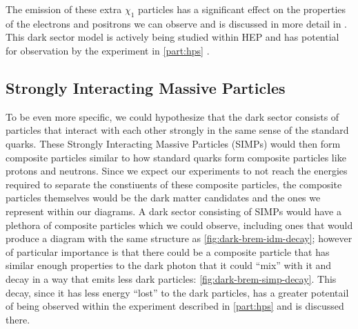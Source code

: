The emission of these extra $\chi_1$ particles has a significant effect on the properties of the electrons
and positrons we can observe and is discussed in more detail in
.
This dark sector model
is actively being studied within HEP and has potential for observation by the experiment in \cref{part:hps}
\cite{darkseaquest-2018}.

\subsection{Strongly Interacting Massive Particles}
\label{sec:theory-simps}

To be even more specific, we could hypothesize that the dark sector consists of particles that
interact with each other strongly in the same sense of the standard quarks. These Strongly
Interacting Massive Particles (SIMPs) \cite{simp-mechanism-2014,simp-pheno-2018} would then form composite particles similar to how standard
quarks form composite particles like protons and neutrons. Since we expect our experiments to
not reach the energies required to separate the constiuents of these composite particles,
the composite particles themselves would be the dark matter candidates and the ones we represent
within our diagrams. A dark sector consisting of SIMPs would have a plethora of composite particles
which we could observe, including ones that would produce a diagram with the same structure as
\cref{fig:dark-brem-idm-decay}; however of particular importance is that there could be a composite
particle that has similar enough properties to the dark photon that it could ``mix'' with it and
decay in a way that emits less dark particles: \cref{fig:dark-brem-simp-decay}. This decay, since
it has less energy ``lost'' to the dark particles, has a greater potentail of being observed within
the experiment described in \cref{part:hps} and is discussed there.


